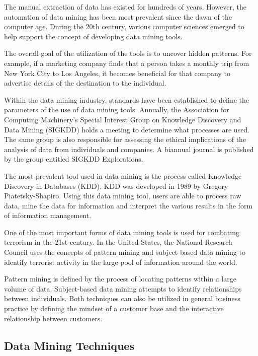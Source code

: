 \documentclass[11pt]{article} %
\begin{document}
The manual extraction of data has existed for hundreds of years. However, the automation of data mining has been most prevalent since the dawn of the computer age. During the 20th century, various computer sciences emerged to help support the concept of developing data mining tools.



The overall goal of the utilization of the tools is to uncover hidden patterns. For example, if a marketing company finds that a person takes a monthly trip from New York City to Los Angeles, it becomes beneficial for that company to advertise details of the destination to the individual.



Within the data mining industry, standards have been established to define the parameters of the use of data mining tools. Annually, the Association for Computing Machinery's Special Interest Group on Knowledge Discovery and Data Mining (SIGKDD) holds a meeting to determine what processes are used. The same group is also responsible for assessing the ethical implications of the analysis of data from individuals and companies. A biannual journal is published by the group entitled SIGKDD Explorations.



The most prevalent tool used in data mining is the process called Knowledge Discovery in Databases (KDD). KDD was developed in 1989 by Gregory Piatetsky-Shapiro. Using this data mining tool, users are able to process raw data, mine the data for information and interpret the various results in the form of information management.



One of the most important forms of data mining tools is used for combating terrorism in the 21st century. In the United States, the National Research Council uses the concepts of pattern mining and subject-based data mining to identify terrorist activity in the large pool of information around the world.



Pattern mining is defined by the process of locating patterns within a large volume of data. Subject-based data mining attempts to identify relationships between individuals. Both techniques can also be utilized in general business practice by defining the mindset of a customer base and the interactive relationship between customers.

\subsection{Data Mining Techniques}
\end{document}
